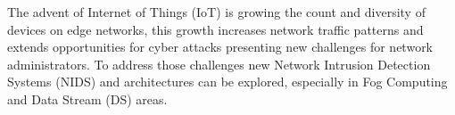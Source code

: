 \documentclass[conference]{IEEEtran}
\begin{document}

\newcommand{\refminas}{\textit{Ref}\xspace}
\newcommand{\mfog}{\textit{MFOG}\xspace}
\newcommand{\iot}{IoT\xspace}

The advent of Internet of Things (\iot) is growing the count and diversity of
devices on edge networks, this growth increases network traffic patterns and
extends opportunities for cyber attacks presenting new challenges for network
administrators.
To address those challenges new Network Intrusion Detection Systems (NIDS) and
architectures can be explored, especially in Fog Computing and Data Stream (DS)
areas.



\end{document}
